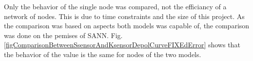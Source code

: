 Only the behavior of the single node was compared, not the efficiancy of a network of nodes. 
This is due to time constraints and the size of this project.
As the comparison was based on aspects both models was capable of, the comparison was done on the pemises of SANN.
Fig. \ref{figComparisonBetweenSsensorAndKsensorDepolCurveFIXEdError} shows that the behavior of the value is the same for nodes of the two models.

% 

